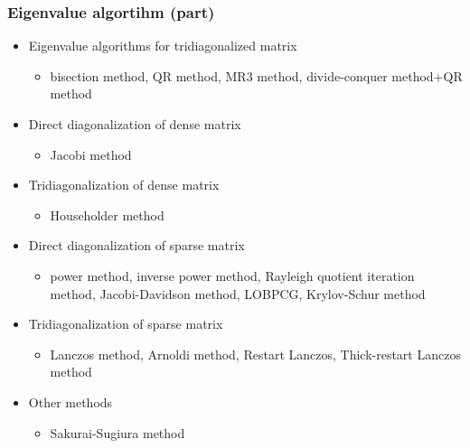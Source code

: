 \begin{frame}
  \frametitle{Eigenvalue algortihm (part)}
  \begin{itemize}
  \item Eigenvalue algorithms for tridiagonalized matrix
    \begin{itemize}
      \item bisection method, QR method, MR3 method, divide-conquer method+QR method
    \end{itemize}
  \item Direct diagonalization of dense matrix
    \begin{itemize}
      \item Jacobi method
    \end{itemize}
  \item Tridiagonalization of dense matrix
    \begin{itemize}
      \item Householder method
    \end{itemize}
  \item Direct diagonalization of sparse matrix
    \begin{itemize}
      \item power method, inverse power method, Rayleigh quotient iteration method, Jacobi-Davidson method, LOBPCG, Krylov-Schur method
    \end{itemize}
  \item Tridiagonalization of sparse matrix
    \begin{itemize}
      \item Lanczos method, Arnoldi method, Restart Lanczos, Thick-restart Lanczos method
    \end{itemize}
  \item Other methods
    \begin{itemize}
      \item Sakurai-Sugiura method
    \end{itemize}
  \end{itemize}
\end{frame}

